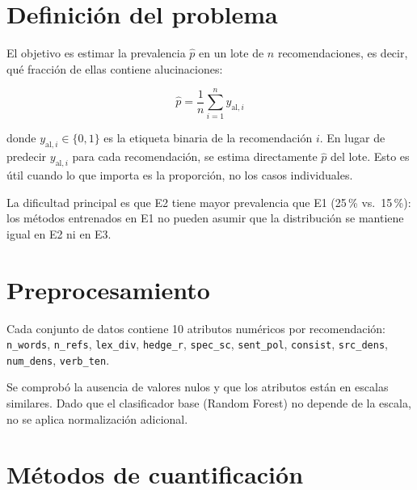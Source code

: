 \documentclass[11pt,a4paper]{article}
\begin{document}
\section{Definición del problema}

El objetivo es estimar la prevalencia $\hat{p}$ en un lote de $n$
recomendaciones, es decir, qué fracción de ellas contiene alucinaciones:

\begin{equation}
    \hat{p} = \frac{1}{n}\sum_{i=1}^{n} y_{\text{al},i}
\end{equation}

donde $y_{\text{al},i} \in \{0,1\}$ es la etiqueta binaria de la
recomendación $i$. En lugar de predecir $y_{\text{al},i}$ para cada
recomendación, se estima directamente $\hat{p}$ del lote. Esto es útil
cuando lo que importa es la proporción, no los casos individuales.

La dificultad principal es que E2 tiene mayor prevalencia que E1
(25\,\% vs.\ 15\,\%): los métodos entrenados en E1 no pueden asumir que
la distribución se mantiene igual en E2 ni en E3.


\section{Preprocesamiento}

Cada conjunto de datos contiene 10 atributos numéricos por recomendación:
\texttt{n\_words}, \texttt{n\_refs}, \texttt{lex\_div}, \texttt{hedge\_r},
\texttt{spec\_sc}, \texttt{sent\_pol}, \texttt{consist}, \texttt{src\_dens},
\texttt{num\_dens}, \texttt{verb\_ten}.

Se comprobó la ausencia de valores nulos y que los atributos están en escalas
similares. Dado que el clasificador base (Random Forest) no depende de la
escala, no se aplica normalización adicional.


\section{Métodos de cuantificación}
\end{document}
